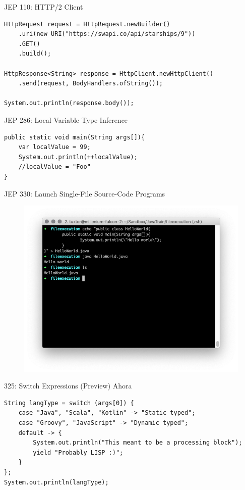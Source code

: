 \documentclass[aspectratio=169]{beamer}
\begin{document}
\begin{frame}[fragile]{JEP 110: HTTP/2 Client }
\begin{lstlisting}
HttpRequest request = HttpRequest.newBuilder()
    .uri(new URI("https://swapi.co/api/starships/9"))
    .GET()
    .build();

HttpResponse<String> response = HttpClient.newHttpClient()
    .send(request, BodyHandlers.ofString());

System.out.println(response.body());
\end{lstlisting}
\end{frame}


\begin{frame}[fragile]{JEP 286: Local-Variable Type Inference}
\begin{lstlisting}
public static void main(String args[]){
    var localValue = 99;
    System.out.println(++localValue);
    //localValue = "Foo"
}
\end{lstlisting}
\end{frame}

\begin{frame}[fragile]{JEP 330: Launch Single-File Source-Code Programs}
    \begin{figure}
        \centering
        \includegraphics[width=0.9\linewidth]{Images/jep222singlefile}
    \end{figure}

\end{frame}

\begin{frame}[fragile]{325: Switch Expressions (Preview)}
Ahora
\begin{lstlisting}
String langType = switch (args[0]) {
    case "Java", "Scala", "Kotlin" -> "Static typed";
    case "Groovy", "JavaScript" -> "Dynamic typed";
    default -> {
        System.out.println("This meant to be a processing block");
        yield "Probably LISP :)";
    }
};
System.out.println(langType);
\end{lstlisting}
\end{frame}
\end{document}
